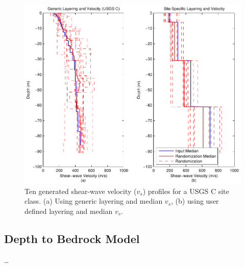 \documentclass[11pt]{report}
\begin{document}
\begin{figure}[tbp]
  \begin{center}
	\includegraphics[width=\linewidth]{figures/rand/profile.pdf}
  \end{center}
  \caption{Ten generated shear-wave velocity ($v_s$) profiles for a USGS C site class. (a) Using
  generic layering and median $v_s$, (b) using user defined layering and median $v_s$.}
  \label{fig:rand:vsProfile}
\end{figure}
\clearpage

\subsection{Depth to Bedrock Model}
\ldots
\end{document}

